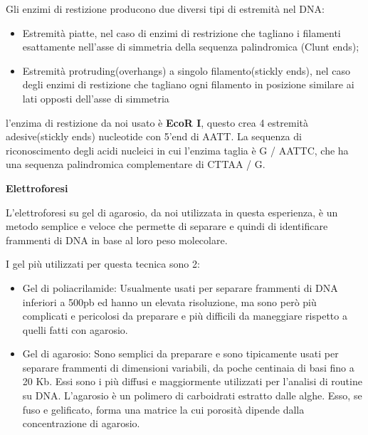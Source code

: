Gli enzimi di restizione producono due diversi tipi di estremità nel DNA:
\begin{itemize}

	\item Estremità piatte, nel caso di enzimi di restrizione che tagliano i filamenti esattamente nell'asse di simmetria della sequenza palindromica (Clunt ends);
	\item Estremità protruding(overhangs) a singolo filamento(stickly ends), nel caso degli enzimi di restizione che tagliano ogni filamento in posizione similare ai lati opposti dell'asse di simmetria

\end{itemize}

l'enzima di restizione da noi usato è \textbf{EcoR I}, questo crea 4 estremità adesive(stickly ends) nucleotide con  5'end  di AATT. La sequenza di riconoscimento degli acidi nucleici in cui l'enzima taglia è G / ​​AATTC, che ha una sequenza palindromica complementare di CTTAA / G.

\vspace{0.5cm}


\textbf{Elettroforesi }

\vspace{0.3cm}



L'elettroforesi su gel di agarosio, da noi utilizzata in questa esperienza, è un
metodo semplice e veloce che permette di separare e quindi di identificare
frammenti di DNA in base al loro peso molecolare.

I gel più utilizzati per questa tecnica sono 2:
\begin{itemize}

	\item{Gel di poliacrilamide: } Usualmente usati per separare frammenti di
	DNA inferiori a 500pb ed hanno un elevata risoluzione, ma sono però più complicati
	e pericolosi da preparare e più difficili da maneggiare rispetto a quelli fatti con agarosio.

	\item{Gel di agarosio: } Sono semplici da preparare e sono tipicamente usati per
	separare frammenti di dimensioni variabili, da poche centinaia di basi fino a 20 Kb.
	Essi sono i più diffusi e maggiormente utilizzati per l'analisi di routine su DNA.
	L'agarosio è un polimero di carboidrati estratto dalle alghe.
	Esso, se fuso e gelificato, forma una matrice la cui porosità dipende dalla concentrazione di agarosio.

\end{itemize}

